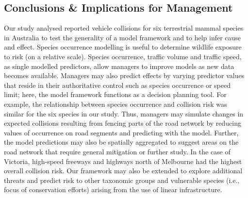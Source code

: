 \subsection{Conclusions \& Implications for Management}

Our study analysed reported vehicle collisions for six terrestrial mammal species in Australia to test the generality of a model framework and to help infer cause and effect. Species occurrence modelling is useful to determine wildlife exposure to risk (on a relative scale). Species occurrence, traffic volume and traffic speed, as single modelled predictors, allow managers to improve models as new data becomes available. Managers may also predict effects by varying predictor values that reside in their authoritative control such as species occurrence or speed limit; here, the model framework functions as a decision planning tool. For example, the relationship between species occurrence and collision risk was similar for the six species in our study. Thus, managers may simulate changes in expected collisions resulting from fencing parts of the road network by reducing values of occurrence on road segments and predicting with the model. Further, the model predictions may also be spatially aggregated to suggest areas on the road network that require general mitigation or further study.  In the case of Victoria, high-speed freeways and highways north of Melbourne had the highest overall collision risk. Our framework may also be extended to explore additional threats and predict risk to other taxonomic groups and vulnerable species (i.e., focus of conservation efforts) arising from the use of linear infrastructure.

